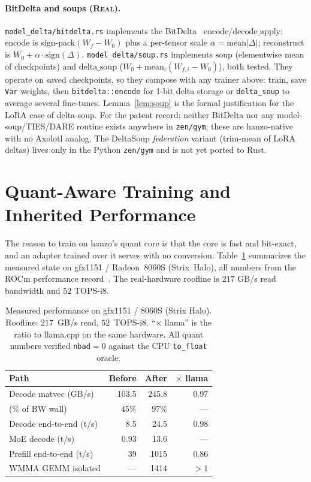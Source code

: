 \documentclass[11pt]{article}
\begin{document}
\paragraph{BitDelta and soups (\textsc{Real}).} \texttt{model\_delta/bitdelta.rs} implements the BitDelta~\cite{liu2024bitdelta} $\mathrm{encode}$/$\mathrm{decode\_apply}$: encode is sign-pack$(W_{\!f}-W_0)$ plus a per-tensor scale $\alpha = \mathrm{mean}|\Delta|$; reconstruct is $W_0 + \alpha \cdot \mathrm{sign}(\Delta)$. \texttt{model\_delta/soup.rs} implements $\mathrm{soup}$ (elementwise mean of checkpoints) and $\mathrm{delta\_soup}$ ($W_0 + \mathrm{mean}_i(W_{\!f,i}-W_0)$), both tested. They operate on saved checkpoints, so they compose with any trainer above: train, save \texttt{Var} weights, then \texttt{bitdelta::encode} for 1-bit delta storage or \texttt{delta\_soup} to average several fine-tunes. Lemma~\ref{lem:soup} is the formal justification for the LoRA case of delta-soup. For the patent record: neither BitDelta nor any model-soup/TIES/DARE routine exists anywhere in \texttt{zen/gym}; these are hanzo-native with no Axolotl analog. The DeltaSoup \emph{federation} variant (trim-mean of LoRA deltas) lives only in the Python \texttt{zen/gym} and is not yet ported to Rust.

\section{Quant-Aware Training and Inherited Performance}
\label{sec:perf}

The reason to train on hanzo's quant core is that the core is fast and bit-exact, and an adapter trained over it serves with no conversion. Table~\ref{tab:perf} summarizes the measured state on gfx1151 / Radeon~8060S (Strix~Halo), all numbers from the ROCm performance record~\cite{hanzo-rocm}. The real-hardware roofline is $217$ GB/s read bandwidth and $52$ TOPS-i8.

\begin{table}[t]
\centering
\small
\caption{Measured performance on gfx1151 / 8060S (Strix Halo). Roofline: $217$~GB/s read, $52$~TOPS-i8. ``$\times$ llama'' is the ratio to llama.cpp on the same hardware. All quant numbers verified \texttt{nbad}$=0$ against the CPU \texttt{to\_float} oracle.}
\label{tab:perf}
\begin{tabular}{@{}lrrr@{}}
\toprule
\textbf{Path} & \textbf{Before} & \textbf{After} & \textbf{$\times$ llama} \\
\midrule
Decode matvec (GB/s) & 103.5 & 245.8 & 0.97 \\
\quad (\% of BW wall) & 45\% & 97\% & --- \\
Decode end-to-end (t/s) & 8.5 & 24.5 & 0.98 \\
MoE decode (t/s) & 0.93 & 13.6 & --- \\
Prefill end-to-end (t/s) & 39 & 1015 & 0.86 \\
\quad WMMA GEMM isolated & --- & 1414 & $>1$ \\
\bottomrule
\end{tabular}
\end{table}
\end{document}
